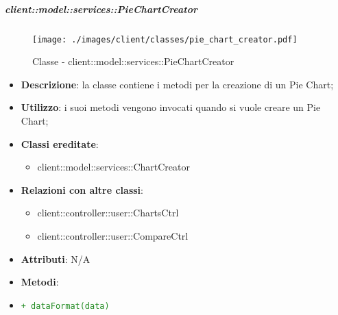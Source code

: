 		\subparagraph{client::model::services::PieChartCreator} %
		\label{subp:piechartcreator}
			\begin{figure}[htbp]
				\centering
				\centerline{\texttt{[image: ./images/client/classes/pie\_chart\_creator.pdf]}}
				\caption{Classe - client::model::services::PieChartCreator}
			\end{figure}
			\begin{itemize}
				\item \textbf{Descrizione}: la classe contiene i metodi per la creazione di un Pie Chart;
				\item \textbf{Utilizzo}: i suoi metodi vengono invocati quando si vuole creare un Pie Chart;
				\item \textbf{Classi ereditate}:
					\begin{itemize}
						\item client::model::services::ChartCreator
					\end{itemize}
				\item \textbf{Relazioni con altre classi}:
					\begin{itemize}
						\item client::controller::user::ChartsCtrl
						\item client::controller::user::CompareCtrl
					\end{itemize}
				\item \textbf{Attributi}: N/A
				\item \textbf{Metodi}: 
					\item \textcolor{forestgreen}{\texttt{+ dataFormat(data)}}
			\end{itemize}

